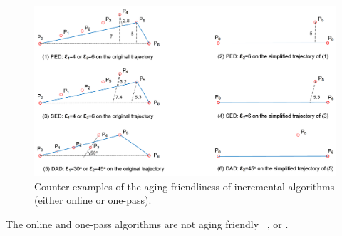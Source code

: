 \begin{figure}[tb!]
	\centering
	\includegraphics[scale=0.66]{Figures/Fig-aging-incre.png}
	\vspace{-1ex}
	\caption{\small Counter examples of the aging friendliness of incremental algorithms (either online or one-pass).}
	\vspace{-1ex}
	\label{fig:aging-incre}
\end{figure}

\begin{proposition}
	\label{theo-aging-online}
	The online and one-pass algorithms are not aging friendly \wrt~\ped, \sed or \dad.

\end{proposition}


